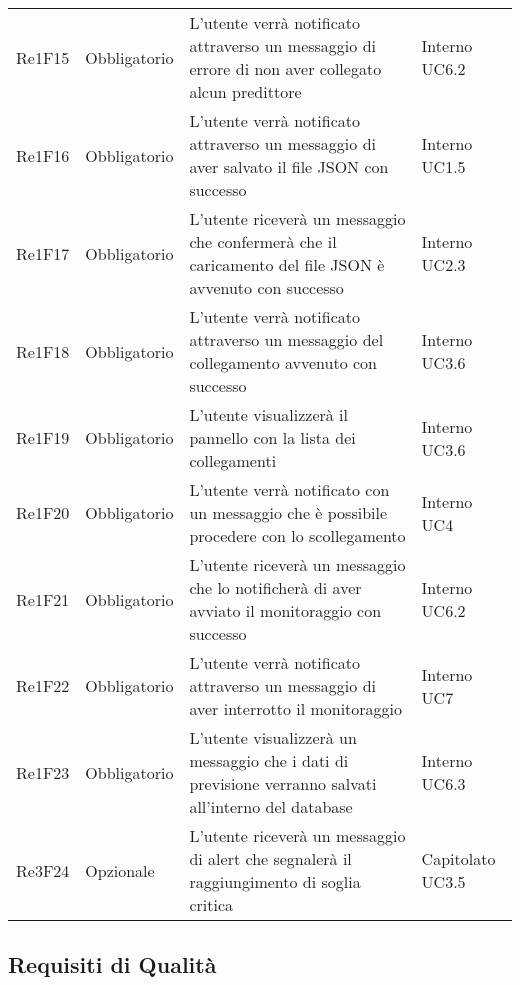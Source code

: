 \begin{longtable}{C{3cm} C{3cm} L{5.5cm} C{3cm}}
Re1F15 & Obbligatorio & L’utente verrà notificato attraverso un messaggio di errore di non aver collegato alcun predittore  &  Interno
UC6.2\\
Re1F16 & Obbligatorio & L’utente verrà notificato attraverso un messaggio di aver salvato il file JSON con successo  & Interno UC1.5\\
Re1F17 & Obbligatorio & L’utente riceverà un messaggio che confermerà che il caricamento del file JSON è avvenuto con successo &  Interno UC2.3\\
Re1F18 & Obbligatorio & L’utente verrà notificato attraverso un messaggio del collegamento avvenuto con successo &  Interno
UC3.6\\
Re1F19 & Obbligatorio & L’utente visualizzerà il pannello con la lista dei collegamenti & Interno UC3.6\\
Re1F20 & Obbligatorio & L’utente verrà notificato con un messaggio che è possibile procedere con lo scollegamento &  Interno UC4\\
Re1F21 & Obbligatorio & L’utente riceverà un messaggio che lo notificherà di aver avviato il monitoraggio con successo  & Interno UC6.2\\
Re1F22 & Obbligatorio & L’utente verrà notificato attraverso un messaggio di aver interrotto il monitoraggio &  Interno UC7\\
Re1F23 & Obbligatorio & L’utente visualizzerà un messaggio che i dati di previsione verranno salvati all’interno del database & Interno UC6.3\\
Re3F24 & Opzionale & L’utente riceverà un messaggio di alert che segnalerà il raggiungimento di soglia critica & Capitolato UC3.5\\
\end{longtable}


\pagebreak
 	\subsection{Requisiti di Qualità}


